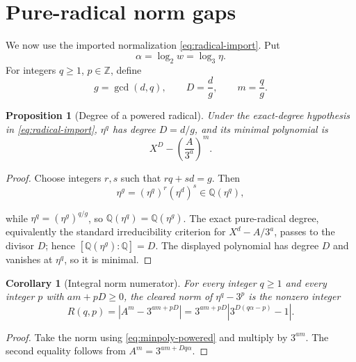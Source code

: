 \documentclass[11pt]{article}
\newtheorem{proposition}[theorem]{Proposition}
\newtheorem{corollary}[theorem]{Corollary}
\theoremstyle{definition}
\newcommand{\Z}{\mathbb Z}
\newcommand{\Q}{\mathbb Q}
\begin{document}
\section{Pure-radical norm gaps}
\label{sec:radical-norm}

We now use the imported normalization \cref{eq:radical-import}.  Put
\begin{equation}\label{eq:alpha-radical}
 \alpha=\log_2w=\log_3\eta.
\end{equation}
For integers \(q\ge1\), \(p\in\Z\), define
\begin{equation}\label{eq:gDm}
 g=\gcd(d,q),
 \qquad D=\frac d g,
 \qquad m=\frac q g.
\end{equation}

\begin{proposition}[Degree of a powered radical]\label{prop:powered-radical}
Under the exact-degree hypothesis in \cref{eq:radical-import},
\(\eta^q\) has degree \(D=d/g\), and its minimal polynomial is
\begin{equation}\label{eq:minpoly-powered}
 X^D-\left(\frac{A}{3^a}\right)^m.
\end{equation}
\end{proposition}

\begin{proof}
Choose integers \(r,s\) such that \(rq+sd=g\).  Then
\[
 \eta^g=(\eta^q)^r(\eta^d)^s\in\Q(\eta^q),
\]

while \(\eta^q=(\eta^g)^{q/g}\), so
\(\Q(\eta^q)=\Q(\eta^g)\).  The exact pure-radical degree, equivalently the
standard irreducibility criterion for \(X^d-A/3^a\), passes to the divisor
\(D\); hence \([\Q(\eta^g):\Q]=D\).  The displayed polynomial has degree
\(D\) and vanishes at \(\eta^q\), so it is minimal.
\end{proof}

\begin{corollary}[Integral norm numerator]\label{cor:norm-numerator}
For every integer \(q\ge1\) and every integer \(p\) with \(am+pD\ge0\), the
cleared norm of \(\eta^q-3^p\) is the nonzero integer
\begin{equation}\label{eq:Rqp}
 R(q,p)=\left|A^m-3^{am+pD}\right|
 =3^{am+pD}\left|3^{D(q\alpha-p)}-1\right|.
\end{equation}
\end{corollary}

\begin{proof}
Take the norm using \cref{eq:minpoly-powered} and multiply by \(3^{am}\).
The second equality follows from
\(A^m=3^{am+Dq\alpha}\).
\end{proof}
\end{document}
